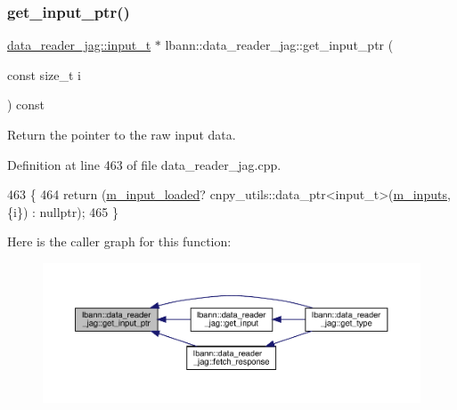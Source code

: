 \subsubsection{\texorpdfstring{get\+\_\+input\+\_\+ptr()}{get\_input\_ptr()}}
{\footnotesize\ttfamily \hyperlink{classlbann_1_1data__reader__jag_ab08c9af4bca496b7889de1473c3d8d4e}{data\+\_\+reader\+\_\+jag\+::input\+\_\+t} $\ast$ lbann\+::data\+\_\+reader\+\_\+jag\+::get\+\_\+input\+\_\+ptr (\begin{DoxyParamCaption}\item[{const size\+\_\+t}]{i }\end{DoxyParamCaption}) const}



Return the pointer to the raw input data. 



Definition at line 463 of file data\+\_\+reader\+\_\+jag.\+cpp.


\begin{DoxyCode}
463                                                                            \{
464   \textcolor{keywordflow}{return} (\hyperlink{classlbann_1_1data__reader__jag_ae047bbae82c4a8eceedceeea2e1815ad}{m\_input\_loaded}? cnpy\_utils::data\_ptr<input\_t>(\hyperlink{classlbann_1_1data__reader__jag_aa3ae2023ad77d767e717a24b91dbd548}{m\_inputs}, \{i\}) : \textcolor{keyword}{nullptr});
465 \}
\end{DoxyCode}
Here is the caller graph for this function\+:\nopagebreak
\begin{figure}[H]
\begin{center}
\leavevmode
\includegraphics[width=350pt]{classlbann_1_1data__reader__jag_a5535a2dc025d484ac01a6aad8585c9b5_icgraph}
\end{center}
\end{figure}
\mbox{\label{classlbann_1_1data__reader__jag_aaf9fbe3e290dc1d4bb13fb203e33e313}} 
